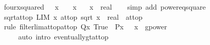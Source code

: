 \begin{isabellebody}
\isanewline
%
\endisadelimproof
\isanewline
{}\isamarkupfalse%
\ four{\isacharunderscore}{\kern0pt}x{\isacharunderscore}{\kern0pt}squared{\isacharcolon}{\kern0pt}\ {\isachardoublequoteopen}{}\ {\isacharasterisk}{\kern0pt}\ x\ {\isacharequal}{\kern0pt}\ {\isacharparenleft}{\kern0pt}{}\ {\isacharasterisk}{\kern0pt}\ x{\isacharparenright}{\kern0pt}\isanewline
\ \ \ x\ {\isacharcolon}{\kern0pt}{\isacharcolon}{\kern0pt}\ real\isanewline
%
\isadelimproof
\ \ %
\endisadelimproof
%
\isatagproof
{}\isamarkupfalse%
\ {\isacharparenleft}{\kern0pt}simp\ add{\isacharcolon}{\kern0pt}\ power{}{\isacharunderscore}{\kern0pt}eq{\isacharunderscore}{\kern0pt}square{\isacharparenright}{\kern0pt}%
\endisatagproof
{\isafoldproof}%
%
\isadelimproof
\isanewline
%
\endisadelimproof
\isanewline
{}\isamarkupfalse%
\ sqrt{\isacharunderscore}{\kern0pt}at{\isacharunderscore}{\kern0pt}top{\isacharcolon}{\kern0pt}\ {\isachardoublequoteopen}LIM\ x\ at{\isacharunderscore}{\kern0pt}top{\isachardot}{\kern0pt}\ sqrt\ x\ {\isacharcolon}{\kern0pt}{\isacharcolon}{\kern0pt}\ real\ {\isacharcolon}{\kern0pt}{\isachargreater}{\kern0pt}\ at{\isacharunderscore}{\kern0pt}top{\isachardoublequoteclose}\isanewline
%
\isadelimproof
\ \ %
\endisadelimproof
%
\isatagproof
{}\isamarkupfalse%
\ {\isacharparenleft}{\kern0pt}rule\ filterlim{\isacharunderscore}{\kern0pt}at{\isacharunderscore}{\kern0pt}top{\isacharunderscore}{\kern0pt}at{\isacharunderscore}{\kern0pt}top{\isacharbrackleft}{\kern0pt}\ Q{\isacharequal}{\kern0pt}{\isachardoublequoteopen}{\isasymlambda}x{\isachardot}{\kern0pt}\ True{\isachardoublequoteclose}\ \ P{\isacharequal}{\kern0pt}{\isachardoublequoteopen}{\isasymlambda}x{\isachardot}{\kern0pt}\ {}\ {\isacharless}{\kern0pt}\ x{\isachardoublequoteclose}\ \ g{\isacharequal}{\kern0pt}{\isachardoublequoteopen}power{}{\isachardoublequoteclose}{\isacharbrackright}{\kern0pt}{\isacharparenright}{\kern0pt}\isanewline
\ \ \ \ \ {\isacharparenleft}{\kern0pt}auto\ intro{\isacharcolon}{\kern0pt}\ eventually{\isacharunderscore}{\kern0pt}gt{\isacharunderscore}{\kern0pt}at{\isacharunderscore}{\kern0pt}top{\isacharparenright}{\kern0pt}%
\endisatagproof
{\isafoldproof}%
%
\isadelimproof
%
\endisadelimproof
%
\isadelimdocument
%
\endisadelimdocument
%
\isatagdocument
%
\isamarkuptrue%
%
\endisatagdocument

\end{isabellebody}
